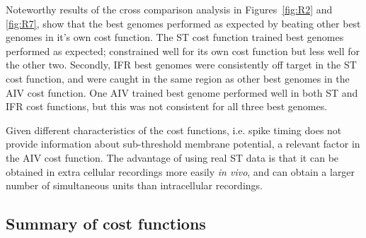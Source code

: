 \smallskip{}


Noteworthy results of the cross comparison analysis in Figures~\ref{fig:R2}
and \ref{fig:R7}, show that the best genomes performed as expected by
beating other best genomes in it's own cost function. The ST cost function
trained best genomes performed as expected; constrained well for its own
cost function but less well for the other two. Secondly, IFR best genomes
were consistently off target in the ST cost function, and were caught in
the same region as other best genomes in the AIV cost function. One AIV
trained best genome performed well in both ST and IFR cost functions, but
this was not consistent for all three best genomes.

Given different characteristics of the cost functions, i.e. spike timing
does not provide information about sub-threshold membrane potential, a
relevant factor in the AIV cost function.  The advantage of using real ST
data is that it can be obtained in extra cellular recordings more easily
\textit{in vivo}, and can obtain a larger number of simultaneous units than
intracellular recordings.



\subsection{Summary of cost functions}\label{sec:GA:summ-cost-funct}


